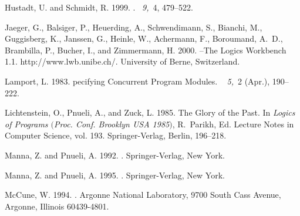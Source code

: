 \documentclass[nohyperref]{acmtrans2f}
\begin{document}
\begin{thebibliography}{}
{\sc Hustadt, U.} {\sc and} {\sc Schmidt, R.} 1999.
.
~{\em 9,\/}~4,
  479--522.

{\sc Jaeger, G.}, {\sc Balsiger, P.}, {\sc Heuerding, A.}, {\sc Schwendimann,
  S.}, {\sc Bianchi, M.}, {\sc Guggisberg, K.}, {\sc Janssen, G.}, {\sc Heinle,
  W.}, {\sc Achermann, F.}, {\sc Boroumand, A.~D.}, {\sc Brambilla, P.}, {\sc
  Bucher, I.}, {\sc and} {\sc Zimmermann, H.} 2000.
--{T}he {L}ogics {W}orkbench 1.1.
\newblock http://www.lwb.unibe.ch/.
\newblock University of Berne, Switzerland.

{\sc Lamport, L.} 1983.
pecifying {C}oncurrent {P}rogram {M}odules.
~{\em
  5,\/}~2 (Apr.), 190--222.

{\sc Lichtenstein, O.}, {\sc Pnueli, A.}, {\sc and} {\sc Zuck, L.} 1985.
\newblock The {G}lory of the {P}ast.
\newblock In {\em Logics of Programs $($Proc. Conf. Brooklyn USA 1985$)$},
  {R.~Parikh}, Ed. Lecture Notes in Computer Science, vol. 193.
  Springer-Verlag, Berlin, 196--218.

{\sc Manna, Z.} {\sc and} {\sc Pnueli, A.} 1992.
.
\newblock Springer-Verlag, New York.

{\sc Manna, Z.} {\sc and} {\sc Pnueli, A.} 1995.
.
\newblock Springer-Verlag, New York.

{\sc McCune, W.} 1994.
.
\newblock Argonne National Laboratory, 9700 South Cass Avenue, Argonne,
  Illinois 60439-4801.


\end{thebibliography}
\end{document}
